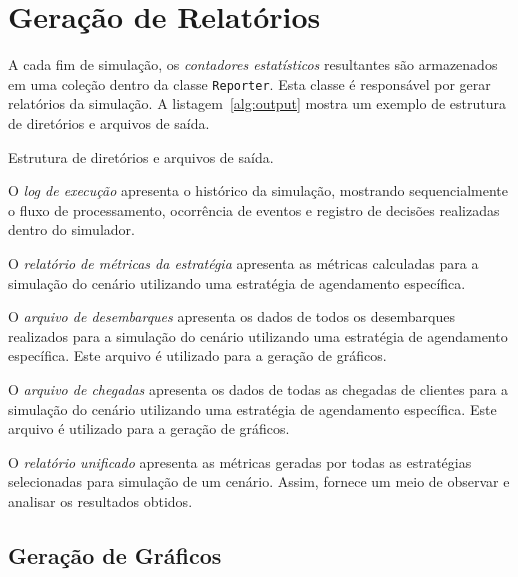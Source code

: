 \section{Geração de Relatórios} \label{model:report}

A cada fim de simulação, os \textit{contadores estatísticos} resultantes são
armazenados em uma coleção dentro da classe \texttt{Reporter}. Esta classe é
responsável por gerar relatórios da simulação. A listagem~\ref{alg:output}
mostra um exemplo de estrutura de diretórios e arquivos de saída.

\begin{listing}[H]
\caption
   {\label{alg:output}Estrutura de diretórios e arquivos de saída.}
\end{listing}

\begin{description}[leftmargin=!,labelwidth=\widthof{\bfseries Arquivo de Desembarques}]
\item[Log de Execução]
O \textit{log de execução} apresenta o histórico da simulação,
mostrando sequencialmente o fluxo de processamento, ocorrência de eventos e
registro de decisões realizadas dentro do simulador.

\item[Métricas da Estratégia]
O \textit{relatório de métricas da estratégia} apresenta as métricas calculadas
para a simulação do cenário utilizando uma estratégia de agendamento específica.

\item[Arquivo de Desembarques]
O \textit{arquivo de desembarques} apresenta os dados de todos os desembarques
realizados para a simulação do cenário utilizando uma estratégia de agendamento
específica. Este arquivo é utilizado para a geração de gráficos.

\item[Arquivo de Chegadas]
O \textit{arquivo de chegadas} apresenta os dados de todas as chegadas de
clientes para a simulação do cenário utilizando uma estratégia de agendamento
específica. Este arquivo é utilizado para a geração de gráficos.

\item[Relatório Unificado]
O \textit{relatório unificado} apresenta as métricas geradas por todas as
estratégias selecionadas para simulação de um cenário. Assim, fornece um meio de
observar e analisar os resultados obtidos.

\end{description}

\subsection{\label{model:report:charts}Geração de Gráficos}

\lipsum[5]